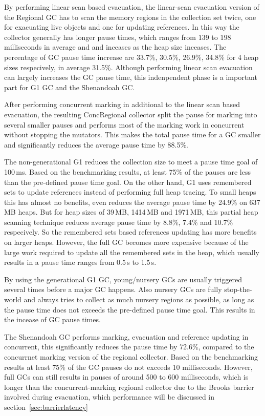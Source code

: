 By performing linear scan based evacuation, the linear-scan evacuation version of the Regional
GC has to scan the memory regions in the collection set twice, one for exacuating live objects and
one for updating references. In this way the collector generally has longer pause times,
which ranges from $139$ to $198$ milliseconds in average and and inceases as the heap size inceases.
The percentage of GC pause time increase are 33.7\%, 30.5\%, 26.9\%, 34.8\% for 4 heap sizes
respecively, in average 31.5\%.
Although performing linear scan evacuation can largely increases the GC pause time,
this indenpendent phase is a important part for G1 GC and the Shenandoah GC.

After performing concurrent marking in additional to the linear scan based evacuation,
the resulting ConcRegional collector split the pause for marking into several smaller
pauses and performs most of the marking work in concurrent without stopping the mutators.
This makes the total pause time for a GC smaller and significantly reduces the average
pause time by 88.5\%.

The non-generational G1 reduces the collection size to meet a pause time goal of 100\,ms.
Based on the benchmarking results, at least 75\% of the pauses are less than the pre-defined
pause time goal. On the other hand, G1 uses remembered sets to update references
instead of performing full heap tracing.
To small heaps this has almost no benefits, even reduces the average pause time by
24.9\% on 637\,MB heaps. But for heap sizes of 39\,MB, 1414\,MB and 1971\,MB, this
partial heap scanning technique reduces average pause time by 8.8\%, 7.4\% and 10.7\%
respecively. So the remembered sets based references updating has more benefits on
larger heaps. However, the full GC becomes more expensive because of the large work required
to update all the remembered sets in the heap, which usually results in a pause time
ranges from 0.5\,s to 1.5\,s.

By using the generational G1 GC, young/nursery GCs are usually triggered several times
before a major GC happens. Also nursery GCs are fully stop-the-world and always tries
to collect as much nursery regions as possible, as long as the pause time does not exceeds
the pre-defined pause time goal. This results in the incease of GC pause times.

The Shenandoah GC performs marking, evacuation and reference updating in concurrent,
this significantly reduces the pause time by 72.6\%, compared to the concurrnet marking version
of the regional collector. Based on the benchmarking results at least 75\% of
the GC pauses do not exceeds 10 milliseconds. However, full GCs can still results
in pauses of around 500 to 600 milliseconds, which is longer than the concurrent-marking
regional collector due to the Brooks barrier involved during evacuation, which performance
will be discussed in section~\ref{sec:barrierlatency}

